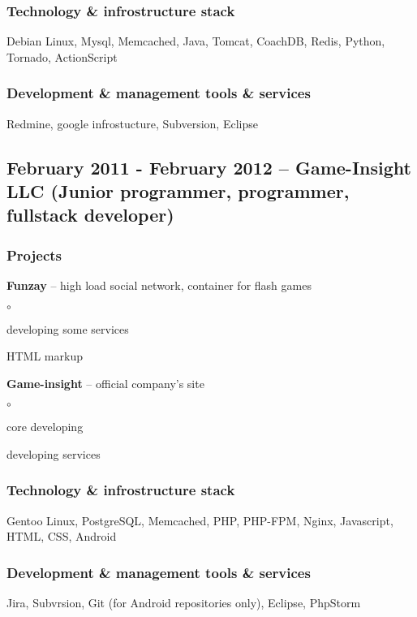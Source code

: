 \documentclass[9pt, a4paper, english]{extarticle}
\begin{document}
    \subsubsection* {Technology \& infrostructure stack}
      Debian Linux, Mysql, Memcached, Java, Tomcat, CoachDB, Redis, Python,
      Tornado, ActionScript
    \subsubsection* {Development \& management tools \& services}
      Redmine, google infrostucture, Subversion, Eclipse


  \subsection* {February 2011 - February 2012 -- \textbf{Game-Insight LLC} (Junior programmer, programmer, fullstack developer)}
    \subsubsection* {Projects}
      \begin {list}{\textbullet}{\itemsep=0mm}
        \item \textbf{Funzay} -- high load social network, container for flash games
          \begin {list}{$\circ$}{}
            \item developing some services
            \item HTML markup 
          \end {list} 
        \item \textbf{Game-insight} -- official company's site
          \begin {list}{$\circ$}{}
            \item core developing
            \item developing services
          \end {list}
      \end {list}
    \subsubsection* {Technology \& infrostructure stack}
      Gentoo Linux, PostgreSQL, Memcached, PHP, PHP-FPM, Nginx, Javascript,
      HTML, CSS, Android
    \subsubsection* {Development \& management tools \& services}
      Jira, Subvrsion, Git (for Android repositories only), Eclipse, PhpStorm
\end{document}
